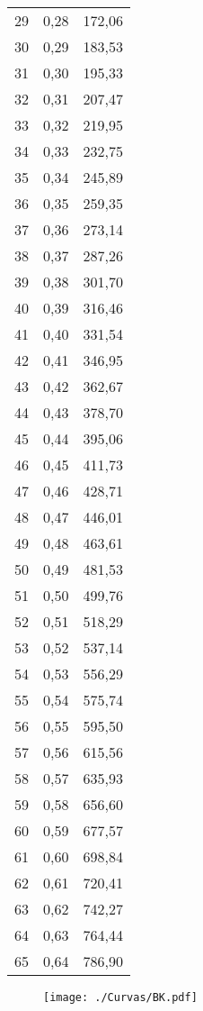 \documentclass[]{article}
\begin{document}
\begin{longtable}[t]{ccc}
29 & 0,28 & 172,06\\
30 & 0,29 & 183,53\\
31 & 0,30 & 195,33\\
32 & 0,31 & 207,47\\
33 & 0,32 & 219,95\\
34 & 0,33 & 232,75\\
35 & 0,34 & 245,89\\
36 & 0,35 & 259,35\\
37 & 0,36 & 273,14\\
38 & 0,37 & 287,26\\
39 & 0,38 & 301,70\\
40 & 0,39 & 316,46\\
41 & 0,40 & 331,54\\
42 & 0,41 & 346,95\\
43 & 0,42 & 362,67\\
44 & 0,43 & 378,70\\
45 & 0,44 & 395,06\\
46 & 0,45 & 411,73\\
47 & 0,46 & 428,71\\
48 & 0,47 & 446,01\\
49 & 0,48 & 463,61\\
50 & 0,49 & 481,53\\
51 & 0,50 & 499,76\\
52 & 0,51 & 518,29\\
53 & 0,52 & 537,14\\
54 & 0,53 & 556,29\\
55 & 0,54 & 575,74\\
56 & 0,55 & 595,50\\
57 & 0,56 & 615,56\\
58 & 0,57 & 635,93\\
59 & 0,58 & 656,60\\
60 & 0,59 & 677,57\\
61 & 0,60 & 698,84\\
62 & 0,61 & 720,41\\
63 & 0,62 & 742,27\\
64 & 0,63 & 764,44\\
65 & 0,64 & 786,90\\*
\end{longtable}

\clearpage

\begin{sidewaysfigure}[htb]
   \centering
   \texttt{[image: ./Curvas/BK.pdf]}
\end{sidewaysfigure}
\end{document}
